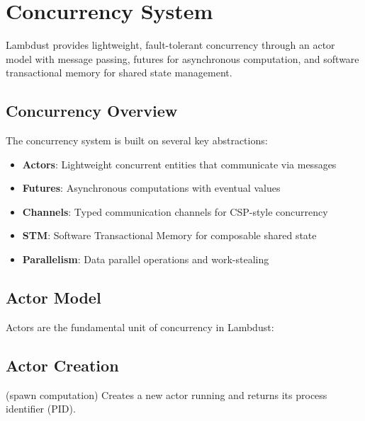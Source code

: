 \chapter{Concurrency System}
\label{ch:concurrency}

Lambdust provides lightweight, fault-tolerant concurrency through an actor model with message passing, futures for asynchronous computation, and software transactional memory for shared state management.

\section{Concurrency Overview}
\label{sec:concurrency-overview}

The concurrency system is built on several key abstractions:

\begin{itemize}
\item \textbf{Actors}: Lightweight concurrent entities that communicate via messages
\item \textbf{Futures}: Asynchronous computations with eventual values
\item \textbf{Channels}: Typed communication channels for CSP-style concurrency  
\item \textbf{STM}: Software Transactional Memory for composable shared state
\item \textbf{Parallelism}: Data parallel operations and work-stealing
\end{itemize}

\section{Actor Model}
\label{sec:actors}


Actors are the fundamental unit of concurrency in Lambdust:

\section{Actor Creation}
\label{sec:actor-creation}

\begin{syntaxspec}{(spawn computation)}
Creates a new actor running  and returns its process identifier (PID).
\end{syntaxspec}

